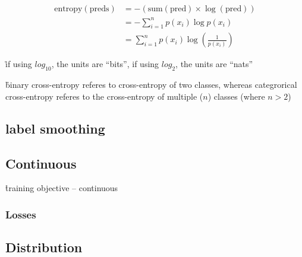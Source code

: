 \begin{equation}
	\begin{split}
		\textrm{entropy} (\textrm{preds})  & =  -(\textrm{sum}(\textrm{pred}) \times \log (\textrm{pred}) )\\
		& = - \sum_{i=1}^{n}p(x_i)\log p(x_i) \\
		& =   \sum_{i=1}^{n}p(x_i)\log ( \frac{1}{p(x_i) } )
	\end{split}
\end{equation}


\r{if using $log_{10}$, the units are ``bits'', if using $log_2$, the units are ``nats''}

\r{binary cross-entropy referes to cross-entropy of two classes, whereas categrorical cross-entropy referes to the cross-entropy of multiple ($n$) classes (where $n > 2$)}

\subsection{label smoothing}



\subsection{Continuous}

\r{training objective -- continuous}

\subsubsection{Losses}




\subsection{Distribution}


